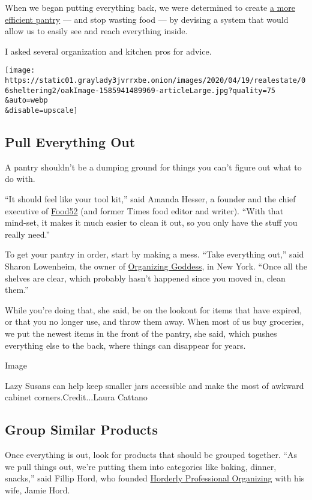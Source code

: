 When we began putting everything back, we were determined to create
\href{https://cooking.nytimes3xbfgragh.onion/guides/56-how-to-stock-a-modern-pantry}{a
more efficient pantry} --- and stop wasting food --- by devising a
system that would allow us to easily see and reach everything inside.

I asked several organization and kitchen pros for advice.

\texttt{[image: https://static01.graylady3jvrrxbe.onion/images/2020/04/19/realestate/06sheltering2/oakImage-1585941489969-articleLarge.jpg?quality=75\\\&auto=webp\\\&disable=upscale]}

\hypertarget{pull-everything-out}{%
\subsection{Pull Everything Out}\label{pull-everything-out}}

A pantry shouldn't be a dumping ground for things you can't figure out
what to do with.

``It should feel like your tool kit,'' said Amanda Hesser, a founder and
the chief executive of \href{https://food52.com/}{Food52} (and former
Times food editor and writer). ``With that mind-set, it makes it much
easier to clean it out, so you only have the stuff you really need.''

To get your pantry in order, start by making a mess. ``Take everything
out,'' said Sharon Lowenheim, the owner of
\href{http://organizinggoddess.com/}{Organizing Goddess}, in New York.
``Once all the shelves are clear, which probably hasn't happened since
you moved in, clean them.''

While you're doing that, she said, be on the lookout for items that have
expired, or that you no longer use, and throw them away. When most of us
buy groceries, we put the newest items in the front of the pantry, she
said, which pushes everything else to the back, where things can
disappear for years.

Image

Lazy Susans can help keep smaller jars accessible and make the most of
awkward cabinet corners.Credit...Laura Cattano

\hypertarget{group-similar-products}{%
\subsection{Group Similar Products}\label{group-similar-products}}

Once everything is out, look for products that should be grouped
together. ``As we pull things out, we're putting them into categories
like baking, dinner, snacks,'' said Fillip Hord, who founded
\href{https://horderly.com/}{Horderly Professional Organizing} with his
wife, Jamie Hord.

